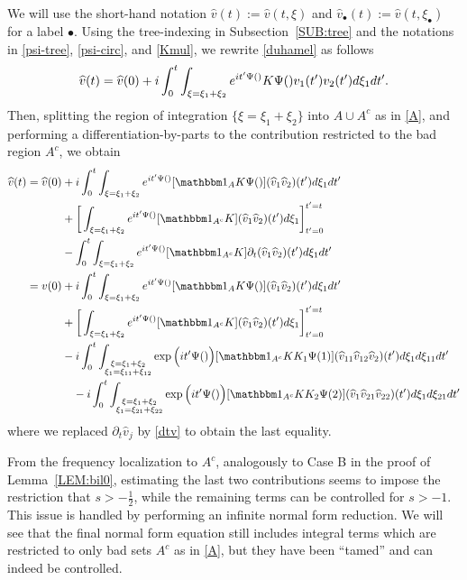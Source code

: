 \documentclass[%
11pt,  reqno]{amsart}
\makeatletter
\newcommand{\5}{\textup{V}}
\newcommand{\ft}{\widehat}
\newcommand{\ind}{\mathbbm 1}
\newcommand{\dt}{\partial_t}
\theoremstyle{remark}
\newcommand{\bul}{\bullet}
\def\<#1>{\csname MH@symb@#1\endcsname}
\numberwithin{equation}{section}
\numberwithin{theorem}{section}
\makeatother
\begin{document}
We will use the short-hand notation $\ft v(t) := \ft v(t,\xi)$ and $\ft v_\bul(t) := \ft v(t,\xi_\bul)$ for a label $\bul$. Using the tree-indexing in Subsection~\ref{SUB:tree} and the notations in \eqref{psi-tree}, \eqref{psi-circ}, and \eqref{Kmul}, we rewrite \eqref{duhamel} as follows
\begin{align}
\label{duhamel2}
\ft v(t) = \ft v(0) + i \int_0^t \int_{\xi = \xi_1 + \xi_2} e^{it' \Psi(\<1>)}  K \Psi(\<1>)   v_{1} (t') v_{2} (t')
d\xi_{1} dt'.
\end{align}
Then, splitting the region of integration $\{\xi=\xi_1+\xi_2\}$ into $A\cup A^c$ as in \eqref{A}, and performing a differentiation-by-parts to the contribution restricted to the bad region $A^c$, we obtain
\begin{align}
\label{NFE01}
\begin{split}
\ft v(t)  
= \ft v(0)  
&
+ i \int_0^t \int_{\xi = \xi_1 + \xi_2} e^{it' \Psi(\<1>)} 
[ \ind_{A} K \Psi(\<1>)   ]
(\ft v_{1} \ft v_{2} )(t')
d\xi_{1}  dt'
\\
&
+ \bigg[ \int_{\xi = \xi_1 + \xi_2} e^{it' \Psi(\<1>)} 
[\ind_{A^c}
 K ] 
(\ft v_{1} \ft v_{2} )(t')
d\xi_{1} 
\bigg]_{t'=0}^{t'=t}
\\
&
-
  \int_0^t \int_{\xi = \xi_1 + \xi_2} e^{it' \Psi(\<1>)} 
[ \ind_{A^c} K ]
\partial_{t} (\ft v_{1} \ft v_{2} )(t')
d\xi_{1} dt'
\\
= v(0)  
&
+ i \int_0^t \int_{\xi = \xi_1 + \xi_2} e^{it' \Psi(\<1>)} 
[ \ind_{A} K \Psi(\<1>)   ]
(\ft v_{1} \ft v_{2} )(t')
d\xi_{1}  dt'
\\
&
+  \bigg[ \int_{\xi = \xi_1 + \xi_2} e^{it' \Psi(\<1>)} 
[\ind_{A^c}
 K ] 
(\ft v_{1} \ft v_{2} )(t')
d\xi_{1} 
\bigg]_{t'=0}^{t'=t}
\\
&
- i
\int_0^t \int_{\substack{\xi = \xi_1 + \xi_2 \\ \xi_1 = \xi_{11}+ \xi_{12}  }} \exp\Big(it' \Psi(\<21>) \Big)
[ \ind_{A^c} K K_1 \Psi(1) ]
 (\ft v_{11} \ft v_{12} \ft v_2 )(t')
d\xi_{1} d\xi_{11} dt'
\\
&
\quad 
-i \int_0^t \int_{\substack{\xi = \xi_1 + \xi_2 \\ \xi_1 = \xi_{21}+ \xi_{22}  }} \exp\Big(it' \Psi(\<22>) \Big)
[ \ind_{A^c} K K_2 \Psi(2) ]
 (\ft v_{1} \ft v_{21} \ft v_{22} )(t')
d\xi_{1} d\xi_{21} dt'
\end{split}
\end{align}
where we replaced $\dt \ft v_j$ by \eqref{dtv} to obtain the last equality. 


From the frequency localization to $A^c$, analogously to Case B in the proof of Lemma~\ref{LEM:bil0}, estimating the last two contributions seems to impose the restriction that $s>-\frac12$, while the remaining terms can be controlled for $s>-1$. This issue is handled by performing an infinite normal form reduction. We will see that the final normal form equation still includes integral terms which are restricted to only bad sets $A^c$ as in \eqref{A}, but they have been ``tamed'' and can indeed be controlled. 
\end{document}
